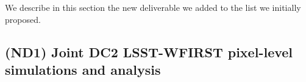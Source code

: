 
\begin{summary}
We describe in this section the new deliverable we added to the list we initially proposed.
\end{summary}

\subsection*{(ND1) Joint DC2 LSST-WFIRST pixel-level simulations and analysis}
\label{sec:joint_simulations}

